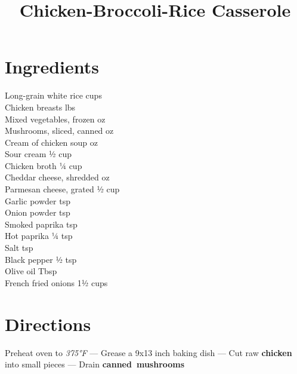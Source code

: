 \documentclass[11pt,letterpaper]{article}
\title{Chicken-Broccoli-Rice Casserole}
\author{}
\date{}
\begin{document}
\maketitle
\thispagestyle{empty}

\section*{Ingredients}
\setlength{\columnsep}{20pt}
\begin{multicols}{2}
\noindent
    Long-grain white rice  cups \\
    Chicken breasts  lbs \\
    Mixed vegetables, frozen  oz \\
    Mushrooms, sliced, canned  oz \\
    Cream of chicken soup  oz \\
    Sour cream \dotfill ½ cup \\
    Chicken broth \dotfill ¼ cup \\
    Cheddar cheese, shredded  oz \\
    \columnbreak
    Parmesan cheese, grated \dotfill ½ cup \\
    Garlic powder  tsp \\
    Onion powder  tsp \\
    Smoked paprika  tsp \\
    Hot paprika \dotfill ¼ tsp \\
    Salt  tsp \\
    Black pepper \dotfill ½ tsp \\
    Olive oil  Tbsp \\
    French fried onions \dotfill 1½ cups \\
\end{multicols}

\section*{Directions}

\noindent
Preheat oven to \textit{375°F} ---
Grease a 9x13 inch baking dish ---
Cut raw \textbf{chicken} into small pieces ---
Drain \textbf{canned~mushrooms}
\end{document}
